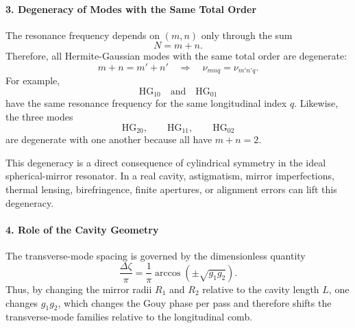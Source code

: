 \begin{resolucao}[Solution]
    \paragraph*{3. Degeneracy of Modes with the Same Total Order}
        The resonance frequency depends on $(m,n)$ only through the sum
        \begin{equation}
            N=m+n.
        \end{equation}
        Therefore, all Hermite-Gaussian modes with the same total order are degenerate:
        \begin{equation}
            m+n=m'+n'
            \quad
            \Rightarrow
            \quad
            \nu_{mnq}=\nu_{m'n'q}.
            \label{eq:same_order_degeneracy}
        \end{equation}
        For example,
        \begin{equation}
            \mathrm{HG}_{10}
            \quad
            \text{and}
            \quad
            \mathrm{HG}_{01}
        \end{equation}
        have the same resonance frequency for the same longitudinal index $q$. Likewise, the three modes
        \begin{equation}
            \mathrm{HG}_{20},
            \qquad
            \mathrm{HG}_{11},
            \qquad
            \mathrm{HG}_{02}
        \end{equation}
        are degenerate with one another because all have $m+n=2$.

        This degeneracy is a direct consequence of cylindrical symmetry in the ideal spherical-mirror resonator. In a real cavity, astigmatism, mirror imperfections, thermal lensing, birefringence, finite apertures, or alignment errors can lift this degeneracy.

    \paragraph*{4. Role of the Cavity Geometry}
        The transverse-mode spacing is governed by the dimensionless quantity
        \begin{equation}
            \frac{\Delta\zeta}{\pi}
            =
            \frac{1}{\pi}
            \arccos\left(
                \pm\sqrt{g_1g_2}
            \right).
            \label{eq:geometry_tuning_factor}
        \end{equation}
        Thus, by changing the mirror radii $R_1$ and $R_2$ relative to the cavity length $L$, one changes $g_1g_2$, which changes the Gouy phase per pass and therefore shifts the transverse-mode families relative to the longitudinal comb.


\end{resolucao}
